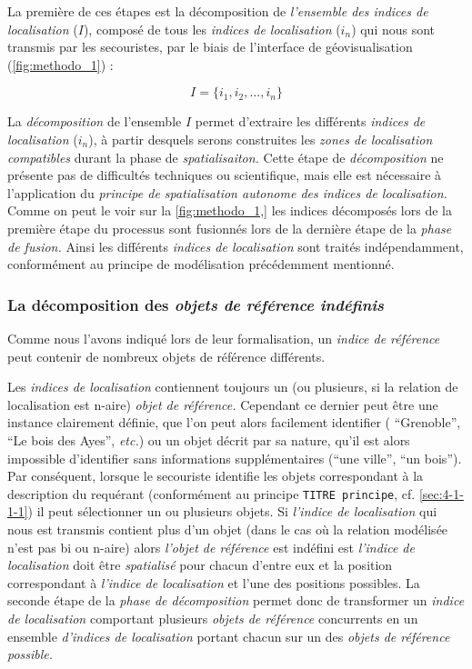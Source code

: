 La première de ces étapes est la décomposition de \emph{l'ensemble des
  indices de localisation} (\(I\)), composé de tous les \emph{indices
  de localisation} (\(i_n\)) qui nous sont transmis par les
secouristes, par le biais de l'interface de géovisualisation
(\autoref{fig:methodo_1}) :

\begin{equation}
  I = \{i_1, i_2, \dots, i_n \}
\end{equation}

La \emph{décomposition} de l'ensemble \(I\) permet d'extraire les
différents \emph{indices de localisation} (\(i_n\)), à partir desquels
serons construites les \emph{zones de localisation compatibles} durant
la phase de \emph{spatialisaiton.} Cette étape de \emph{décomposition}
ne présente pas de difficultés techniques ou scientifique, mais elle
est nécessaire à l’application du \emph{principe de spatialisation
  autonome des indices de localisation.} Comme on peut le voir sur la
\autoref{fig:methodo_1,} les indices décomposés lors de la première
étape du processus sont fusionnés lors de la dernière étape de la
\emph{phase de fusion.}  Ainsi les différents \emph{indices de
  localisation} sont traités indépendamment, conformément au principe
de modélisation précédemment mentionné.

\subsubsection{La décomposition des \emph{objets de référence indéfinis}}

Comme nous l'avons indiqué lors de leur formalisation, un \emph{indice
  de référence} peut contenir de nombreux objets de référence
différents.

Les \emph{indices de localisation} contiennent toujours un (ou
plusieurs, si la relation de localisation est n-aire) \emph{objet de
  référence.} Cependant ce dernier peut être une instance clairement
définie, que l'on peut alors facilement identifier (\eg
\enquote{Grenoble}, \enquote{Le bois des Ayes}, \emph{etc.}) ou un
objet décrit par sa nature, qu'il est alors impossible d'identifier
sans informations supplémentaires (\eg \enquote{une ville},
\enquote{un bois}). Par conséquent, lorsque le secouriste identifie
les objets correspondant à la description du requérant (conformément
au principe \texttt{TITRE principe}, cf. \ref{sec:4-1-1-1}) il peut
sélectionner un ou plusieurs objets. Si \emph{l'indice de
  localisation} qui nous est transmis contient plus d'un objet (dans
le cas où la relation modélisée n'est pas bi ou n-aire) alors
\emph{l'objet de référence} est indéfini est \emph{l'indice de
  localisation} doit être \emph{spatialisé} pour chacun d'entre eux et
la position correspondant à \emph{l'indice de localisation} et l'une
des positions possibles.  La seconde étape de la \emph{phase de
  décomposition} permet donc de transformer un \emph{indice de
  localisation} comportant plusieurs \emph{objets de référence}
concurrents en un ensemble \emph{d'indices de localisation} portant
chacun sur un des \emph{objets de référence possible.}

